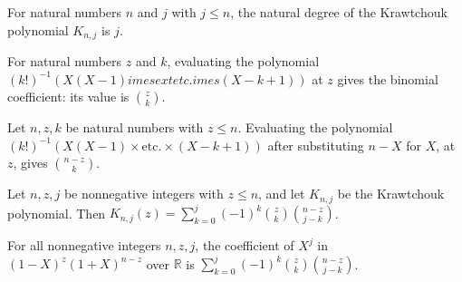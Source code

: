\begin{theorem}
\label{FABL.krawtchoukPolynomial_natDegree}
\leanok
{}
For natural numbers $n$ and $j$ with $j\le n$, the natural degree of the Krawtchouk
polynomial $K_{n,j}$ is $j$.
\end{theorem}

\begin{theorem}
\label{FABL.eval_chooseFactorPolynomial}
\leanok
{}
For natural numbers $z$ and $k$, evaluating the polynomial
$(k!)^{-1}(X(X-1)	imes	ext{etc.}	imes(X-k+1))$ at $z$ gives the binomial coefficient:
its value is $\binom{z}{k}$.
\end{theorem}

\begin{theorem}
\label{FABL.eval_complementChooseFactorPolynomial}
\leanok
{}
Let $n,z,k$ be natural numbers with $z\le n$. Evaluating the polynomial
$(k!)^{-1}(X(X-1)\times\text{etc.}\times(X-k+1))$ after substituting $n-X$ for $X$, at
$z$, gives $\binom{n-z}{k}$.
\end{theorem}

\begin{theorem}
\label{FABL.eval_krawtchoukPolynomial_eq_signedChooseSum}
\leanok
{}
Let $n,z,j$ be nonnegative integers with $z\le n$, and let $K_{n,j}$ be the Krawtchouk
polynomial. Then $K_{n,j}(z)=\sum_{k=0}^{j}(-1)^k\binom{z}{k}\binom{n-z}{j-k}$.
\end{theorem}

\begin{theorem}
\label{FABL.coeff_countGeneratingPolynomial_eq_signedChooseSum}
\leanok
{}
For all nonnegative integers $n,z,j$, the coefficient of $X^j$ in $(1-X)^z(1+X)^{n-z}$
over $\mathbb R$ is $\sum_{k=0}^{j}(-1)^k\binom{z}{k}\binom{n-z}{j-k}$.
\end{theorem}

